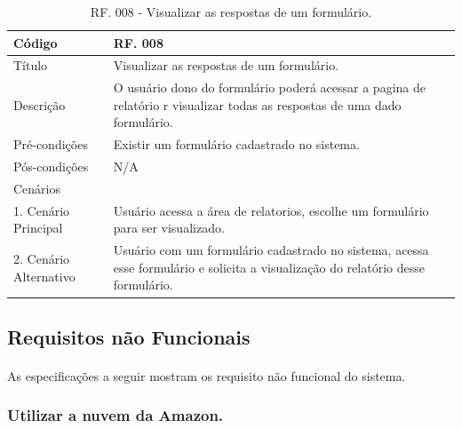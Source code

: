 \documentclass[11pt]{article}
\begin{document}
        \begin{table}[h]
          \begin{center}
            \begin{tabular}{ | p{5cm} | p{10cm} | }
              \hline
              Código\cellcolor{gray} & RF. 008\cellcolor{gray} \\
              \hline
              Título & Visualizar as respostas de um formulário. \\
              \hline
              Descrição & O usuário dono do formulário poderá acessar a pagina de relatório r visualizar todas as respostas de uma dado formulário. \\
              \hline
              Pré-condições & Existir um formulário cadastrado no sistema. \\
              \hline
              Pós-condições & N/A \\
              \hline
              Cenários &   \\
              \hline
              1.  Cenário Principal & Usuário acessa a área de relatorios, escolhe um formulário para ser visualizado. \\
              \hline
              2.  Cenário Alternativo & Usuário com um formulário cadastrado no sistema, acessa esse formulário e solicita a visualização do relatório desse formulário. \\
              \hline
            \end{tabular}
            \caption{RF. 008 - Visualizar as respostas de um formulário.}
          \end{center}
        \end{table}

    \subsection{Requisitos não Funcionais}
    
      \paragraph{}
      As especificações a seguir mostram os requisito não funcional do sistema.

      \subsubsection{Utilizar a nuvem da Amazon.}
\end{document}
